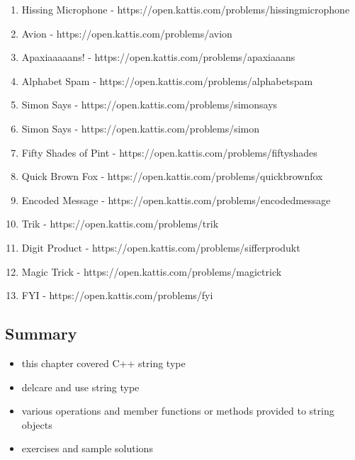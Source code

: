 \documentclass[11pt]{article}
\makeatletter
\providecommand{\tightlist}{%
      \setlength{\itemsep}{0pt}\setlength{\parskip}{0pt}}
\newcommand{\boxspacing}{\kern\kvtcb@left@rule\kern\kvtcb@boxsep}
\newcommand{\prompt}[4]{
        {\ttfamily\llap{{\color{#2}[#3]:\hspace{3pt}#4}}\vspace{-\baselineskip}}
    }
\makeatother
\begin{document}
\begin{enumerate}
\def\labelenumi{\arabic{enumi}.}
\item
  Hissing Microphone -
  https://open.kattis.com/problems/hissingmicrophone
\item
  Avion - https://open.kattis.com/problems/avion
\item
  Apaxiaaaaans! - https://open.kattis.com/problems/apaxiaaans
\item
  Alphabet Spam - https://open.kattis.com/problems/alphabetspam
\item
  Simon Says - https://open.kattis.com/problems/simonsays
\item
  Simon Says - https://open.kattis.com/problems/simon
\item
  Fifty Shades of Pint - https://open.kattis.com/problems/fiftyshades
\item
  Quick Brown Fox - https://open.kattis.com/problems/quickbrownfox
\item
  Encoded Message - https://open.kattis.com/problems/encodedmessage
\item
  Trik - https://open.kattis.com/problems/trik
\item
  Digit Product - https://open.kattis.com/problems/sifferprodukt
\item
  Magic Trick - https://open.kattis.com/problems/magictrick
\item
  FYI - https://open.kattis.com/problems/fyi
\end{enumerate}

    \hypertarget{summary}{%
\subsection{Summary}\label{summary}}

\begin{itemize}
\tightlist
\item
  this chapter covered C++ string type
\item
  delcare and use string type
\item
  various operations and member functions or methods provided to string
  objects
\item
  exercises and sample solutions
\end{itemize}

    \begin{tcolorbox}[breakable, size=fbox, boxrule=1pt, pad at break*=1mm,colback=cellbackground, colframe=cellborder]
\prompt{In}{incolor}{ }{\boxspacing}
\begin{Verbatim}[commandchars=\\\{\}]

\end{Verbatim}
\end{tcolorbox}


    
    
    
\end{document}

